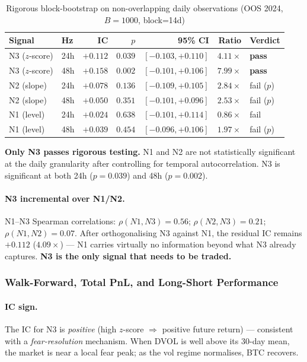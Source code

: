 \documentclass[12pt, a4paper]{article}
\theoremstyle{definition}
\begin{document}
\begin{table}[ht]
\centering
\caption{Rigorous block-bootstrap on non-overlapping daily observations (OOS 2024, $B=1000$, block=14d)}
\label{tab:n3_rigorous}
\begin{tabular}{llrrrrl}
\toprule
Signal & Hz & IC & $p$ & 95\% CI & Ratio & Verdict \\
\midrule
N3 ($z$-score) & 24h & $+0.112$ & $\mathbf{0.039}$ & $[-0.103, +0.110]$ & $4.11\times$ & \textbf{pass} \\
N3 ($z$-score) & 48h & $+0.158$ & $\mathbf{0.002}$ & $[-0.101, +0.106]$ & $7.99\times$ & \textbf{pass} \\
N2 (slope)     & 24h & $+0.078$ & $0.136$           & $[-0.109, +0.105]$ & $2.84\times$ & fail ($p$) \\
N2 (slope)     & 48h & $+0.050$ & $0.351$           & $[-0.101, +0.096]$ & $2.53\times$ & fail ($p$) \\
N1 (level)     & 24h & $+0.024$ & $0.638$           & $[-0.101, +0.114]$ & $0.86\times$ & fail \\
N1 (level)     & 48h & $+0.039$ & $0.454$           & $[-0.096, +0.106]$ & $1.97\times$ & fail ($p$) \\
\bottomrule
\end{tabular}
\end{table}

\noindent \textbf{Only N3 passes rigorous testing.}  N1 and N2 are not
statistically significant at the daily granularity after controlling for
temporal autocorrelation.  N3 is significant at both 24h ($p = 0.039$) and
48h ($p = 0.002$).

\paragraph{N3 incremental over N1/N2.}
N1--N3 Spearman correlations: $\rho(N1, N3) = 0.56$; $\rho(N2, N3) = 0.21$;
$\rho(N1, N2) = 0.07$.  After orthogonalising N3 against N1, the residual IC
remains $+0.112$ ($4.09\times$) --- N1 carries virtually no information beyond
what N3 already captures.  \textbf{N3 is the only signal that needs to be
traded.}

\subsubsection{Walk-Forward, Total PnL, and Long-Short Performance}

\paragraph{IC sign.}
The IC for N3 is \emph{positive} (high $z$-score $\Rightarrow$ positive future
return) --- consistent with a \emph{fear-resolution} mechanism.  When DVOL is
well above its 30-day mean, the market is near a local fear peak; as the vol
regime normalises, BTC recovers.
\end{document}
